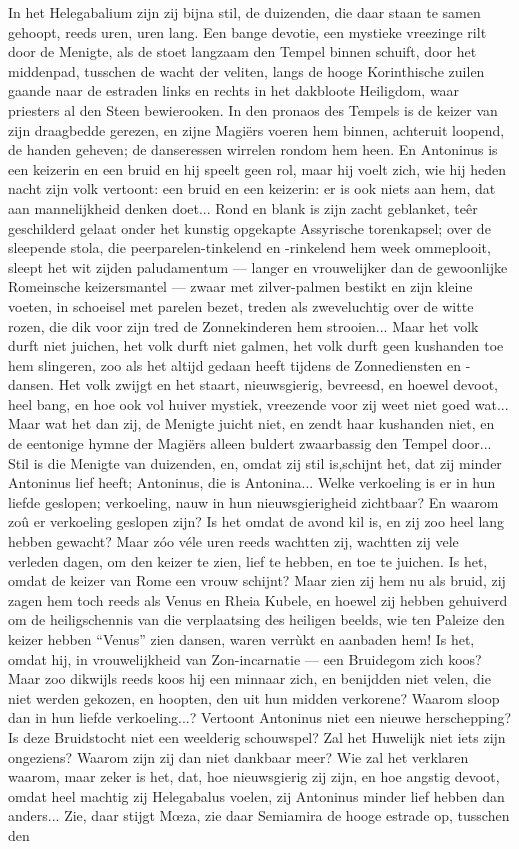 \documentclass[a4paper, 12pt, oneside, dutch]{article}
\begin{document}
In het Helegabalium zijn zij bijna stil, de duizenden, die daar staan te samen gehoopt, reeds uren, uren lang. Een bange devotie, een mystieke vreezinge rilt door de Menigte, als de stoet langzaam den Tempel binnen schuift, door het middenpad, tusschen de wacht der veliten, langs de hooge Korinthische zuilen gaande naar de estraden links en rechts in het dakbloote Heiligdom, waar priesters al den Steen bewierooken. In den pronaos des Tempels is de keizer van zijn draagbedde gerezen, en zijne Magiërs voeren hem binnen, achteruit loopend, de handen geheven; de danseressen wirrelen rondom hem heen. En Antoninus is een keizerin en een bruid en hij speelt geen rol, maar hij voelt zich, wie hij heden nacht zijn volk vertoont: een bruid en een keizerin: er is ook niets aan hem, dat aan mannelijkheid denken doet... Rond en blank is zijn zacht geblanket, teêr geschilderd gelaat onder het kunstig opgekapte Assyrische torenkapsel; over de sleepende stola, die peerparelen-tinkelend en -rinkelend hem week ommeplooit, sleept het wit zijden paludamentum --- langer en vrouwelijker dan de gewoonlijke Romeinsche keizersmantel --- zwaar met zilver-palmen bestikt en zijn kleine voeten, in schoeisel met parelen bezet, treden als zweveluchtig over de witte rozen, die dik voor zijn tred de Zonnekinderen hem strooien... Maar het volk durft niet juichen, het volk durft niet galmen, het volk durft geen kushanden toe hem slingeren, zoo als het altijd gedaan heeft tijdens de Zonnediensten en -dansen. Het volk zwijgt en het staart, nieuwsgierig, bevreesd, en hoewel devoot, heel bang, en hoe ook vol huiver mystiek, vreezende voor zij weet niet goed wat... Maar wat het dan zij, de Menigte juicht niet, en zendt haar kushanden niet, en de eentonige hymne der Magiërs alleen buldert zwaarbassig den Tempel door... Stil is die Menigte van duizenden, en, omdat zij stil is,schijnt het, dat zij minder Antoninus lief heeft; Antoninus, die is Antonina... Welke verkoeling is er in hun liefde geslopen; verkoeling, nauw in hun nieuwsgierigheid zichtbaar? En waarom zoû er verkoeling geslopen zijn? Is het omdat de avond kil is, en zij zoo heel lang hebben gewacht? Maar zóo véle uren reeds wachtten zij, wachtten zij vele verleden dagen, om den keizer te zien, lief te hebben, en toe te juichen. Is het, omdat de keizer van Rome een vrouw schijnt? Maar zien zij hem nu als bruid, zij zagen hem toch reeds als Venus en Rheia Kubele, en hoewel zij hebben gehuiverd om de heiligschennis van die verplaatsing des heiligen beelds, wie ten Paleize den keizer hebben "`Venus"' zien dansen, waren verrùkt en aanbaden hem! Is het, omdat hij, in vrouwelijkheid van Zon-incarnatie --- een Bruidegom zich koos? Maar zoo dikwijls reeds koos hij een minnaar zich, en benijdden niet velen, die niet werden gekozen, en hoopten, den uit hun midden verkorene? Waarom sloop dan in hun liefde verkoeling...? Vertoont Antoninus niet een nieuwe herschepping? Is deze Bruidstocht niet een weelderig schouwspel? Zal het Huwelijk niet iets zijn ongeziens? Waarom zijn zij dan niet dankbaar meer? Wie zal het verklaren waarom, maar zeker is het, dat, hoe nieuwsgierig zij zijn, en hoe angstig devoot, omdat heel machtig zij Helegabalus voelen, zij Antoninus minder lief hebben dan anders... Zie, daar stijgt Mœza, zie daar Semiamira de hooge estrade op, tusschen den 
\end{document}
